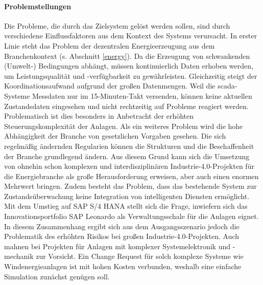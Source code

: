 \paragraph{Problemstellungen}
Die Probleme, die durch das Zielsystem gelöst werden sollen, sind durch verschiedene Einflussfaktoren aus dem Kontext des Systems verursacht. In erster Linie steht das Problem der dezentralen Energieerzeugung aus dem Branchenkontext (s. Abschnitt \ref{energy}). Da die Erzeugung von schwankenden (Umwelt-) Bedingungen abhängt, müssen kontinuierlich Daten erhoben werden, um Leistungsqualität und -verfügbarkeit zu gewährleisten. Gleichzeitig steigt der Koordinationsaufwand aufgrund der großen Datenmengen. Weil die \ac{scada}-Systeme Messdaten nur im 15-Minuten-Takt versenden, können keine aktuellen Zustandsdaten eingesehen und nicht rechtzeitig auf Probleme reagiert werden. Problematisch ist dies besonders in Anbetracht der erhöhten Steuerungskomplexität der Anlagen.
Als ein weiteres Problem wird die hohe Abhängigkeit der Branche von gesetzlichen Vorgaben gesehen. Die sich regelmäßig ändernden Regularien können die Strukturen und die Beschaffenheit der Branche grundlegend ändern. Aus diesem Grund kann sich die Umsetzung von ohnehin schon komplexen und interdisziplinären Industrie-4.0-Projekten für die Energiebranche als große Herausforderung erweisen, aber auch einen enormen Mehrwert bringen. Zudem besteht das Problem, dass das bestehende System zur Zustandsüberwachung keine Integration von intelligenten Diensten ermöglicht. Mit dem Umstieg auf SAP S/4 HANA stellt sich die Frage, inwiefern sich das  Innovationsportfolio SAP Leonardo als Verwaltungsschale für die Anlagen eignet. In diesem Zusammenhang ergibt sich aus dem Ausgangsszenario jedoch die Problematik des erhöhten Risikos bei großen Industrie-4.0-Projekten. Auch \citet{Lauenroth2016} mahnen bei Projekten für Anlagen mit komplexer Systemelektronik und -mechanik zur Vorsicht. Ein Change Request für solch komplexe Systeme wie Windenergieanlagen ist mit hohen Kosten verbunden, weshalb eine einfache Simulation zunächst genügen soll.

